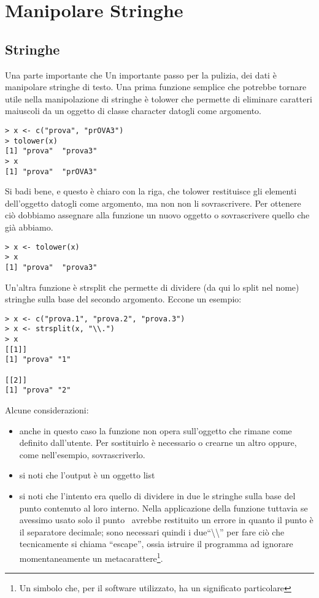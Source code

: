 \chapter{Manipolare Stringhe}
\section{Stringhe}
Una parte importante che 
Un importante passo per la pulizia,  dei dati è manipolare stringhe di testo.  
Una prima funzione semplice che potrebbe tornare utile nella manipolazione di stringhe è \textsf{tolower} che permette di eliminare caratteri maiuscoli da un   oggetto di classe character datogli come argomento. 
\begin{lstlisting}
> x <- c("prova", "prOVA3")
> tolower(x)
[1] "prova"  "prova3"
> x
[1] "prova"  "prOVA3"
\end{lstlisting}
Si badi bene, e questo è chiaro con la riga, che \textsf{tolower} restituisce gli elementi dell'oggetto datogli come argomento, ma non non li sovrascrivere. Per ottenere ciò dobbiamo assegnare alla funzione un nuovo oggetto o sovrascrivere quello che già abbiamo.
\begin{lstlisting}
> x <- tolower(x)
> x
[1] "prova"  "prova3"
\end{lstlisting}

Un'altra funzione è \textsf{strsplit} che permette di dividere (da qui lo split nel nome) stringhe sulla base del secondo argomento. Eccone un esempio:
\begin{lstlisting}
> x <- c("prova.1", "prova.2", "prova.3")
> x <- strsplit(x, "\\.")
> x
[[1]]
[1] "prova" "1"    

[[2]]
[1] "prova" "2"  
\end{lstlisting}
Alcune considerazioni:
\begin{itemize}
\item anche in questo caso la funzione non opera sull'oggetto che rimane come definito dall'utente. Per sostituirlo è necessario o crearne un altro oppure, come nell'esempio, sovrascriverlo.
\item si noti che l'output è un oggetto list
\item si noti che l'intento era quello di dividere in due le stringhe sulla base del punto contenuto al loro interno. Nella applicazione della funzione tuttavia se avessimo usato solo il punto \erre\ avrebbe restituito un errore in quanto il punto è il separatore decimale; sono necessari quindi i due``\textbackslash\textbackslash'' per fare ciò che tecnicamente si chiama ``escape'', ossia istruire il programma ad ignorare momentaneamente un metacarattere\footnote{Un simbolo che, per il software utilizzato, ha un significato particolare}.
\end{itemize}


